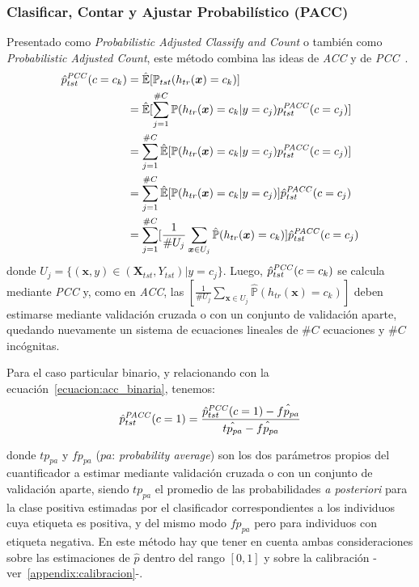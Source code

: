 \subsubsection{Clasificar, Contar y Ajustar Probabilístico
(PACC)}\label{puntual:pacc}

Presentado como {\it Probabilistic Adjusted Classify and Count\/} o también como
{\it Probabilistic Adjusted Count}, este método combina las ideas de {\it ACC\/}
y de {\it PCC\/}~\cite{bella2010quantification, tang2010network}.
\begin{align}
\begin{split}
    \hat p^{\it PCC\/}_{tst}(c=c_k) &= \mathbb{\hat E}[\mathbb{P}_{tst}(h_{tr}(\boldsymbol{x})=c_k)] \\
    &= \mathbb{\hat E}[\sum \limits_{j=1}^{\#C}{\mathbb{P}(h_{tr}(\boldsymbol{x})=c_k|y=c_j) p^{\it PACC\/}_{tst}(c=c_j)}] \\
    &= \sum \limits_{j=1}^{\#C}\mathbb{\hat E}[{\mathbb{P}(h_{tr}(\boldsymbol{x})=c_k|y=c_j) p^{\it PACC\/}_{tst}(c=c_j)}] \\
    &= \sum \limits_{j=1}^{\#C}\mathbb{\hat E}[{\mathbb{P}(h_{tr}(\boldsymbol{x})=c_k|y=c_j)}] \hat p^{\it PACC\/}_{tst}(c=c_j) \\
    &= \sum \limits_{j=1}^{\#C} [\frac {1}{\#U_j} \sum_{\boldsymbol{x} \in U_j} \mathbb{\hat P}(h_{tr}(\boldsymbol{x})=c_k)] \hat p^{\it PACC\/}_{tst}(c=c_j)
\end{split}
\end{align}
donde $U_j=\{(\boldsymbol{x}, y) \in (\boldsymbol{X}_{tst}, Y_{tst}) | y=c_j\}$.
Luego, $\hat p^{\it PCC\/}_{tst}(c=c_k)$ se calcula mediante {\it PCC\/} y, como
en {\it ACC}, las $[\frac {1}{\#U_j} \sum_{\boldsymbol{x} \in U_j}
\mathbb{\hat{P}}(h_{tr}(\boldsymbol{x})=c_k)]$ deben estimarse mediante
validación cruzada o con un conjunto de validación aparte, quedando nuevamente
un sistema de ecuaciones lineales de $\#C$ ecuaciones y $\#C$ incógnitas.

Para el caso particular binario, y relacionando con la
ecuación~\ref{ecuacion:acc_binaria}, tenemos:
\begin{equation}
    \hat p^{\it PACC\/}_{tst}(c=1) = \frac{\hat p^{\it PCC\/}_{tst}(c=1)-\hat{fp_{pa}}}{\hat{tp_{pa}}-\hat{fp_{pa}}}
\end{equation}

donde $tp_{pa}$ y $fp_{pa}$ ($pa$: {\it probability average\/}) son los dos
parámetros propios del cuantificador a estimar mediante validación cruzada o con
un conjunto de validación aparte, siendo $tp_{pa}$ el promedio de las
probabilidades {\it a posteriori\/} para la clase positiva estimadas por el
clasificador correspondientes a los individuos cuya etiqueta es positiva, y del
mismo modo $fp_{pa}$ pero para individuos con etiqueta negativa. En este método
hay que tener en cuenta ambas consideraciones sobre las estimaciones de $\hat p$
dentro del rango $[0, 1]$ y sobre la calibración
-ver~\ref{appendix:calibracion}-.

